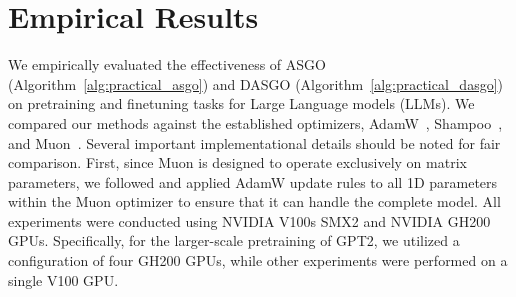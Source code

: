 \documentclass{article}
\theoremstyle{remark}
\begin{document}
\section{Empirical Results}\label{sec:empiricalresults}
We empirically evaluated the effectiveness of ASGO (Algorithm~\ref{alg:practical_asgo}) and DASGO (Algorithm~\ref{alg:practical_dasgo}) on pretraining and finetuning tasks for Large Language models (LLMs). We compared our methods against the established optimizers, %
AdamW~\citep{kingma2014adam,loshchilov2017decoupled}, Shampoo~\citep{gupta2018shampoo}, and Muon~\citep{jordan2024muon}. Several important implementational details should be noted for fair comparison. First, since Muon is designed to operate exclusively on matrix parameters, we followed \citet{jordan2024muon} and applied AdamW update rules to all 1D parameters within the Muon optimizer to ensure that it can handle the complete model. All experiments were conducted using NVIDIA V100s SMX2 and NVIDIA GH200 GPUs. Specifically, for the larger-scale pretraining of GPT2, we utilized a configuration of four GH200 GPUs, while other experiments were performed on a single V100 GPU.
\end{document}
